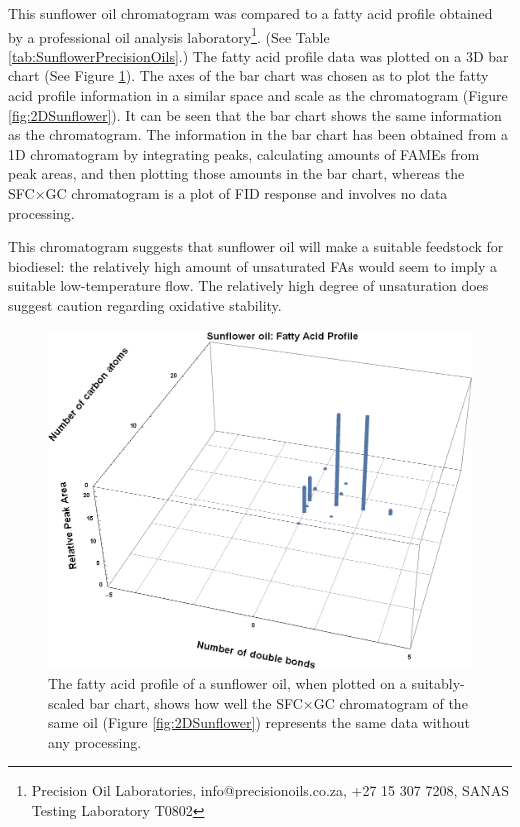 This sunflower oil chromatogram was compared to a fatty acid profile obtained by
a professional oil analysis laboratory\footnote{Precision Oil Laboratories,
info@precisionoils.co.za,  +27 15 307 7208, SANAS Testing Laboratory T0802}.
(See Table \ref{tab:SunflowerPrecisionOils}.) The fatty acid profile data was
plotted on a 3D bar chart (See Figure \ref{fig:2DSunflowerBarChart}). The axes
of the bar chart was chosen as to plot the fatty acid profile information in a
similar space and scale as the chromatogram (Figure \ref{fig:2DSunflower}). It
can be seen that the bar chart shows the same information as the chromatogram.
The information in the bar chart has been obtained from a 1D chromatogram by
integrating peaks, calculating amounts of FAMEs from peak areas, and then
plotting those amounts in the bar chart, whereas the SFC×GC chromatogram is a
plot of FID response and involves no data processing.

This chromatogram suggests that sunflower oil will make a suitable feedstock for
biodiesel: the relatively high amount of unsaturated FAs would seem to imply a
suitable low-temperature flow. The relatively high degree of unsaturation does
suggest caution regarding oxidative stability.

\begin{figure}
\centering
\includegraphics[width=\textwidth]{Figures/BarChart.png}
\decoRule

\caption[3D Bar chart of fatty acid profile]{The fatty acid profile of a
sunflower oil, when plotted on a suitably-scaled bar chart, shows how well the
SFC×GC chromatogram of the same oil (Figure \ref{fig:2DSunflower}) represents
the same data without any processing.}

\label{fig:2DSunflowerBarChart}
\end{figure}

